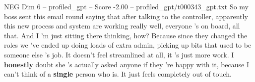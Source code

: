 \begin{textsample}{NEG Dim 6 – profiled\_gpt – Score -2.00 – profiled\_gpt/t000343\_gpt.txt}  \label{ex:f6_neg_019}
So my boss sent this email round saying that after talking to the controller, apparently this new process and system are working really well, everyone ’s on board, all that.
And I ’m just sitting there thinking, how?
Because since they changed the roles we ’ve ended up doing loads of extra admin, picking up bits that used to be someone else ’s job.
It doesn't feel streamlined at all, it ’s just more work.
I \textbf{honestly} doubt she ’s actually asked anyone if they ’re happy with it, because I can't think of a \textbf{single} person who is.
It just feels completely out of touch.

\end{textsample}
